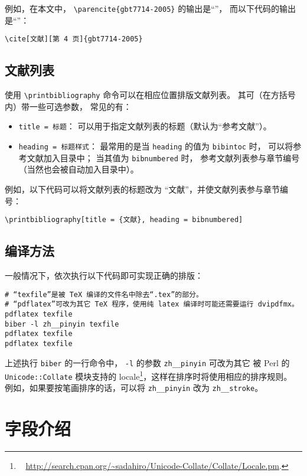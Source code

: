 \documentclass[UTF8]{ctexart}
\begin{document}
例如，在本文中，%
\verb|\parencite{gbt7714-2005}| 的输出是“\parencite{gbt7714-2005}”，
而以下代码的输出是“\cite[文献][第 4 页]{gbt7714-2005}”：
\begin{Verbatim}[frame = single]
\cite[文献][第 4 页]{gbt7714-2005}
\end{Verbatim}

\subsection{文献列表}

使用 \verb|\printbibliography| 命令可以在相应位置排版文献列表。
其可（在方括号内）带一些可选参数\supercite{biblatex}，
常见的有：
\begin{itemize}
	\item \verb|title = 标题|：
		可以用于指定文献列表的标题（默认为“参考文献”）。
	\item \verb|heading = 标题样式|：
		最常用的是当 \verb|heading| 的值为 \verb|bibintoc| 时，
		可以将参考文献加入目录中；
		当其值为 \verb|bibnumbered| 时，
		参考文献列表参与章节编号（当然也会被自动加入目录中）。
\end{itemize}

例如，以下代码可以将文献列表的标题改为 “文献”，并使文献列表参与章节编号：
\begin{Verbatim}[frame = single]
\printbibliography[title = {文献}, heading = bibnumbered]
\end{Verbatim}

\subsection{编译方法}

一般情况下，依次执行以下代码即可实现正确的排版：
\begin{Verbatim}[frame = single]
# “texfile”是被 TeX 编译的文件名中除去“.tex”的部分。
# “pdflatex”可改为其它 TeX 程序，使用纯 latex 编译时可能还需要运行 dvipdfmx。
pdflatex texfile
biber -l zh__pinyin texfile
pdflatex texfile
pdflatex texfile
\end{Verbatim}

上述执行 \verb|biber| 的一行命令中，%
\verb|-l| 的参数 \verb|zh__pinyin| 可改为其它
被 Perl 的 \verb|Unicode::Collate| 模块支持的 locale\footnote{\ %
	\url{http://search.cpan.org/~sadahiro/Unicode-Collate/Collate/Locale.pm}.%
}，这样在排序时将使用相应的排序规则。
例如，如果要按笔画排序的话，可以将 \verb|zh__pinyin| 改为 \verb|zh__stroke|。

\section{字段介绍}\label{sec:fields}
\end{document}
